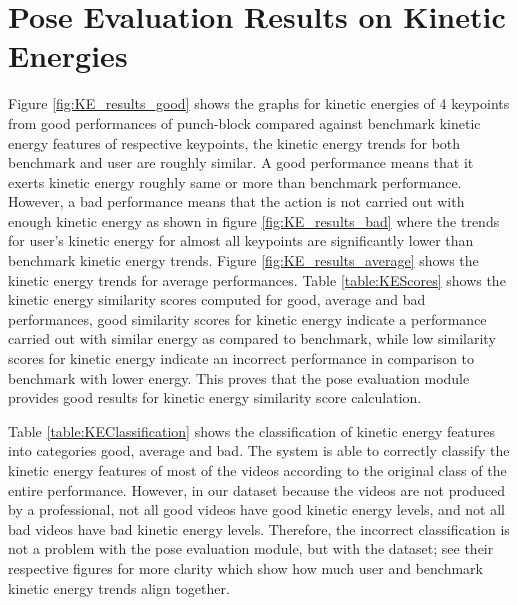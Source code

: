   \section{Pose Evaluation Results on Kinetic Energies}
  Figure \ref{fig:KE_results_good} shows the graphs for kinetic energies of 4 keypoints from good performances of punch-block compared against benchmark kinetic energy features of respective keypoints, the kinetic energy trends for both benchmark and user are roughly similar. A good performance means that it exerts kinetic energy roughly same or more than benchmark performance. However, a bad performance means that the action is not carried out with enough kinetic energy as shown in figure \ref{fig:KE_results_bad} where the trends for user's kinetic energy for almost all keypoints are significantly lower than benchmark kinetic energy trends. Figure \ref{fig:KE_results_average} shows the kinetic energy trends for average performances. Table \ref{table:KEScores} shows the kinetic energy similarity scores computed for good, average and bad performances, good similarity scores for kinetic energy indicate a performance carried out with similar energy as compared to benchmark, while low similarity scores for kinetic energy indicate an incorrect performance in comparison to benchmark with lower energy. This proves that the pose evaluation module provides good results for kinetic energy similarity score calculation. 

  Table \ref{table:KEClassification} shows the classification of kinetic energy features into categories good, average and bad. The system is able to correctly classify the kinetic energy features of most of the videos according to the original class of the entire performance. However, in our dataset because the videos are not produced by a professional, not all good videos have good kinetic energy levels, and not all bad videos have bad kinetic energy levels. Therefore, the incorrect classification is not a problem with the pose evaluation module, but with the dataset; see their respective figures for more clarity which show how much user and benchmark kinetic energy trends align together. 

